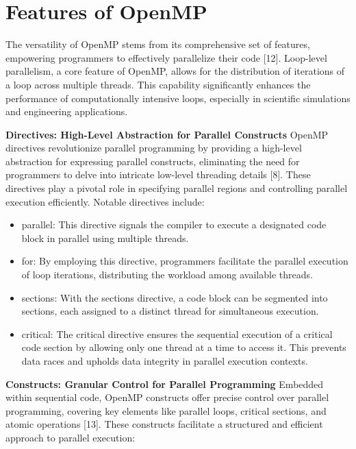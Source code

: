 \documentclass[12pt,conference]{IEEEtran}
\begin{document}
\section{Features of OpenMP}
The versatility of OpenMP stems from its comprehensive set of features, empowering programmers to effectively parallelize their code [12]. Loop-level parallelism, a core feature of OpenMP, allows for the distribution of iterations of a loop across multiple threads. This capability significantly enhances the performance of computationally intensive loops, especially in scientific simulations and engineering applications.

\textbf{Directives: High-Level Abstraction for Parallel Constructs}
OpenMP directives revolutionize parallel programming by providing a high-level abstraction for expressing parallel constructs, eliminating the need for programmers to delve into intricate low-level threading details [8]. These directives play a pivotal role in specifying parallel regions and controlling parallel execution efficiently. Notable directives include:

\begin{itemize}
    \item parallel: This directive signals the compiler to execute a designated code block in parallel using multiple threads.
\end{itemize}

\begin{itemize}
    \item for: By employing this directive, programmers facilitate the parallel execution of loop iterations, distributing the workload among available threads.
\end{itemize}

\begin{itemize}
    \item sections: With the sections directive, a code block can be segmented into sections, each assigned to a distinct thread for simultaneous execution.
\end{itemize}

\begin{itemize}
    \item critical: The critical directive ensures the sequential execution of a critical code section by allowing only one thread at a time to access it. This prevents data races and upholds data integrity in parallel execution contexts.
\end{itemize}
\textbf{Constructs: Granular Control for Parallel Programming}
Embedded within sequential code, OpenMP constructs offer precise control over parallel programming, covering key elements like parallel loops, critical sections, and atomic operations [13]. These constructs facilitate a structured and efficient approach to parallel execution:
\end{document}
